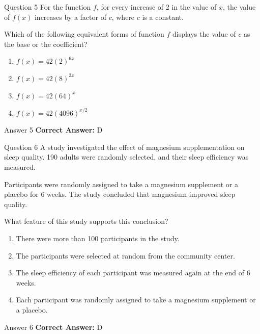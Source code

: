 \documentclass{beamer}
\begin{document}
\begin{frame}{Question 5}
\small
For the function \(f\), for every increase of 2 in the value of \(x\), the value of \(f(x)\) increases by a factor of \(c\), where \(c\) is a constant.

Which of the following equivalent forms of function \(f\) displays the value of \(c\) as the base or the coefficient?
\vspace{0.35cm}
\begin{enumerate}
    \item[A.] \(f(x) = 42(2)^{6x}\)
    \item[B.] \(f(x) = 42(8)^{2x}\)
    \item[C.] \(f(x) = 42(64)^x\)
    \item[D.] \(f(x) = 42(4096)^{x/2}\)
\end{enumerate}
\end{frame}
\begin{frame}{Answer 5}
\small
\textbf{Correct Answer:} D
\end{frame}

\begin{frame}{Question 6}
\small
A study investigated the effect of magnesium supplementation on sleep quality. 190 adults were randomly selected, and their sleep efficiency was measured.

Participants were randomly assigned to take a magnesium supplement or a placebo for 6 weeks. The study concluded that magnesium improved sleep quality.

What feature of this study supports this conclusion?
\vspace{0.35cm}
\begin{enumerate}
    \item[A.] There were more than 100 participants in the study.
    \item[B.] The participants were selected at random from the community center.
    \item[C.] The sleep efficiency of each participant was measured again at the end of 6 weeks.
    \item[D.] Each participant was randomly assigned to take a magnesium supplement or a placebo.
\end{enumerate}
\end{frame}
\begin{frame}{Answer 6}
\small
\textbf{Correct Answer:} D
\end{frame}
\end{document}
